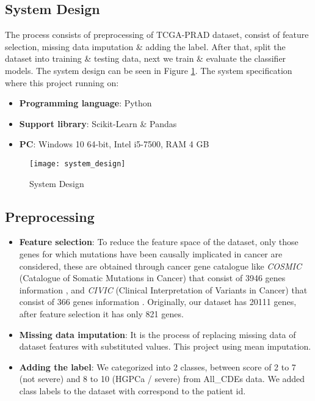 \documentclass[a4paper,oneside]{article}
\begin{document}
\subsection{System Design}
The process consists of preprocessing of TCGA-PRAD dataset, consist of feature selection, missing data imputation \& adding the label. After that, split the dataset into training \& testing data, next we train \& evaluate the classifier models. The system design can be seen in Figure \ref{fig:system_design}. The system specification where this project running on:
\begin{itemize}
\item \textbf{Programming language}: Python
\item \textbf{Support library}: Scikit-Learn \& Pandas
\item \textbf{PC}: Windows 10 64-bit, Intel i5-7500, RAM 4 GB
\end{itemize}

\begin{figure}
  \texttt{[image: system\_design]}
  \centering
  \caption{System Design}
  \label{fig:system_design}
\end{figure}

\subsection{Preprocessing}
\begin{itemize}
\item \textbf{Feature selection}: To reduce the feature space of the dataset, only those genes for which mutations have been causally implicated in cancer are considered, these are obtained through cancer gene catalogue like \textit{COSMIC} (Catalogue of Somatic Mutations in Cancer) that consist of 3946 genes information \cite{cosmicdata}, and \textit{CIVIC} (Clinical Interpretation of Variants in Cancer) that consist of 366 genes information \cite{civicdata}. Originally, our dataset has 20111 genes, after feature selection it has only 821 genes.
\item \textbf{Missing data imputation}: It is the process of replacing missing data of dataset features with substituted values. This project using mean imputation.
\item \textbf{Adding the label}: We categorized into 2 classes, between score of 2 to 7 (not severe) and 8 to 10 (HGPCa / severe)  from All\_CDEs data. We added class labels to the dataset with correspond to the patient id.

\end{itemize}
\end{document}
